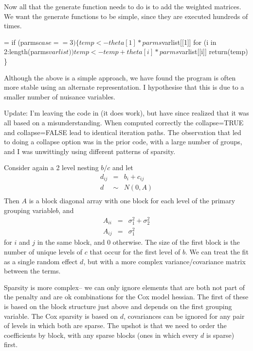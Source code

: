 \documentclass{article}
\begin{document}
Now all that the generate function needs to do is to
add the weighted matrices.  
We want the generate functions to be simple, since they are executed hundreds
of times.
\begin{nwchunk}
=
 if (parms$case==3) \{
     temp <- theta[1]* parms$varlist[[1]]
     for (i in 2:length(parms$varlist)) 
         temp <- temp + theta[i]*parms$varlist[[i]]
     return(temp)
     \}
\end{nwchunk}

Although the above is a simple approach, we have found the program 
is often more stable using an alternate
representation. 
I hypothesise that this is due to a smaller number of nuisance
variables. 

Update: I'm leaving the code in (it does work), but have since realized that %
it was all based on a misunderstanding.  When computed correctly the
collapse=TRUE and collapse=FALSE lead to identical iteration paths.
The observation that led to doing a collapse option was in the prior code,
with a large number of groups, and I was unwittingly using different patterns
of sparsity.

Consider again a 2 level nesting $b/c$ and let
\begin{eqnarray*}
 d_{ij}&=& b_i + c_{ij} \\
 d &\sim& N(0, A) \\
\end{eqnarray*}
Then $A$ is a block diagonal array with one block for each level
of the primary grouping variable$b$, and
\begin{eqnarray*}
  A_{ii} &=& \sigma_1^2 + \sigma_2^2\\
  A_{ij} &=& \sigma_1^2
\end{eqnarray*}
for $i$ and $j$ in the same block, and 0 otherwise.
The size of the first block is the number of unique levels of $c$ that
occur for the first level of $b$.
We can treat the fit as a single random effect $d$, but with a more
complex variance/covariance matrix between the terms.

Sparsity is more complex-- we can only ignore elements that are both
not part of the penalty and are ok combinations for the Cox model hessian.
The first of these is based on the block structure just
above and depends on the first grouping variable.  The Cox sparsity
is based on $d$, covariances can be ignored for any pair of levels in
which both are sparse.  The upshot is that we need to order the coefficients
by block, with any sparse blocks (ones in which every $d$ is sparse) first.
\end{document}
